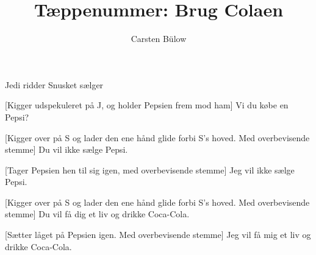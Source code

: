 \documentclass[a4paper,11pt]{article}
\title{Tæppenummer: Brug Colaen}
\author{Carsten Bülow}
\begin{document}
\maketitle

\begin{roles}
 Jedi ridder 
 Snusket sælger 
\end{roles}

\begin{props}
\end{props}

\begin{sketch}


 [Kigger udspekuleret på J, og holder Pepsien frem mod ham] Vi
du købe en Pepsi?

 [Kigger over på S og lader den ene hånd glide forbi S's hoved. Med
overbevisende stemme] Du vil ikke sælge Pepsi.

 [Tager Pepsien hen til sig igen, med overbevisende stemme]
Jeg vil ikke sælge Pepsi.


 [Kigger over på S og lader den ene hånd glide forbi S's hoved. Med
overbevisende stemme] Du vil få dig et liv og drikke Coca-Cola.

 [Sætter låget på Pepsien igen. Med
overbevisende stemme] Jeg vil få mig et liv og drikke Coca-Cola.





\end{sketch}
\end{document}
